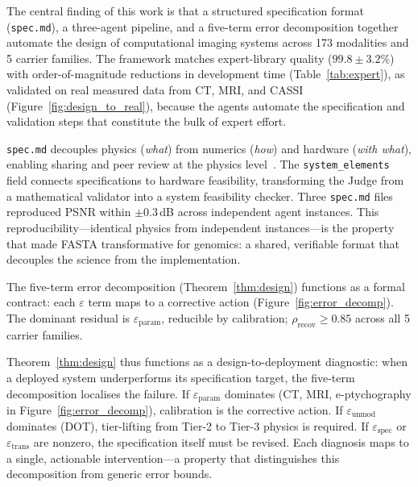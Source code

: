 \documentclass[11pt,a4paper]{article}
\newcommand{\eps}{\varepsilon}
\begin{document}
The central finding of this work is that a structured specification format (\texttt{spec.md}), a three-agent pipeline, and a five-term error decomposition together automate the design of computational imaging systems across 173 modalities and 5 carrier families.  The framework matches expert-library quality ($99.8\pm3.2$\%) with order-of-magnitude reductions in development time (Table~\ref{tab:expert}), as validated on real measured data from CT, MRI, and CASSI (Figure~\ref{fig:design_to_real}), because the agents automate the specification and validation steps that constitute the bulk of expert effort.

\texttt{spec.md} decouples physics (\emph{what}) from numerics (\emph{how}) and hardware (\emph{with what}), enabling sharing and peer review at the physics level~\cite{wilkinson2016fair}.  The \texttt{system\_elements} field connects specifications to hardware feasibility, transforming the Judge from a mathematical validator into a system feasibility checker.  Three \texttt{spec.md} files reproduced PSNR within $\pm 0.3$\,dB across independent agent instances.  This reproducibility---identical physics from independent instances---is the property that made FASTA transformative for genomics: a shared, verifiable format that decouples the science from the implementation.

The five-term error decomposition (Theorem~\ref{thm:design}) functions as a formal contract: each $\eps$ term maps to a corrective action (Figure~\ref{fig:error_decomp}).  The dominant residual is $\eps_{\text{param}}$, reducible by calibration; $\rho_{\text{recov}} \geq 0.85$ across all 5 carrier families.

Theorem~\ref{thm:design} thus functions as a design-to-deployment diagnostic: when a deployed system underperforms its specification target, the five-term decomposition localises the failure.  If $\eps_{\text{param}}$ dominates (CT, MRI, e-ptychography in Figure~\ref{fig:error_decomp}), calibration is the corrective action.  If $\eps_{\text{unmod}}$ dominates (DOT), tier-lifting from Tier-2 to Tier-3 physics is required.  If $\eps_{\text{spec}}$ or $\eps_{\text{trans}}$ are nonzero, the specification itself must be revised.  Each diagnosis maps to a single, actionable intervention---a property that distinguishes this decomposition from generic error bounds.
\end{document}
